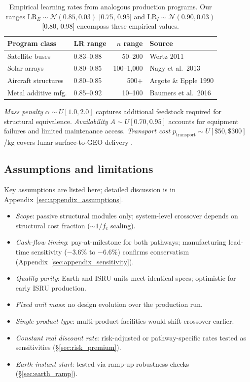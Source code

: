 \documentclass[preprint,12pt]{elsarticle}
\begin{document}
\begin{table}[htbp]
\centering
\caption{Empirical learning rates from analogous production programs. Our ranges $\mathrm{LR}_E \sim \mathcal{N}(0.85, 0.03)$ [0.75, 0.95] and $\mathrm{LR}_I \sim \mathcal{N}(0.90, 0.03)$ [0.80, 0.98] encompass these empirical values.}
\label{tab:empirical_lr}
\small
\begin{tabular}{@{}llrl@{}}
\toprule
Program class & LR range & $n$ range & Source \\
\midrule
Satellite buses          & 0.83--0.88 & 50--200    & Wertz 2011 \cite{wertz2011} \\
Solar arrays             & 0.80--0.85 & 100--1{,}000 & Nagy et al.\ 2013 \cite{nagy2013} \\
Aircraft structures      & 0.80--0.85 & 500+       & Argote \& Epple 1990 \cite{argote1990} \\
Metal additive mfg.      & 0.85--0.92 & 10--100    & Baumers et al.\ 2016 \cite{baumers2016} \\
\bottomrule
\end{tabular}
\end{table} \emph{Mass penalty} $\alpha \sim U[1.0, 2.0]$ captures additional feedstock required for structural equivalence. \emph{Availability} $A \sim U[0.70, 0.95]$ accounts for equipment failures and limited maintenance access. \emph{Transport cost} $p_{\mathrm{transport}} \sim U[\$50, \$300]$/kg covers lunar surface-to-GEO delivery \cite{ishimatsu2016}.

\subsection{Assumptions and limitations}

Key assumptions are listed here; detailed discussion is in Appendix~\ref{sec:appendix_assumptions}.
\begin{itemize}
  \item \emph{Scope}: passive structural modules only; system-level crossover depends on structural cost fraction ($\sim$$1/f_c$ scaling).
  \item \emph{Cash-flow timing}: pay-at-milestone for both pathways; manufacturing lead-time sensitivity ($-$3.6\% to $-$6.6\%) confirms conservatism (Appendix~\ref{sec:appendix_sensitivity}).
  \item \emph{Quality parity}: Earth and ISRU units meet identical specs; optimistic for early ISRU production.
  \item \emph{Fixed unit mass}: no design evolution over the production run.
  \item \emph{Single product type}: multi-product facilities would shift crossover earlier.
  \item \emph{Constant real discount rate}: risk-adjusted or pathway-specific rates tested as sensitivities (\S\ref{sec:risk_premium}).
  \item \emph{Earth instant start}: tested via ramp-up robustness checks (\S\ref{sec:earth_ramp}).
\end{itemize}
\end{document}
